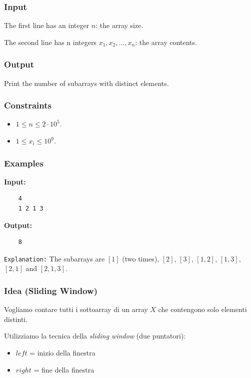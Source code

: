 \subsubsection*{Input}
The first line has an integer $n$: the array size.

\medskip

The second line has n integers $x_1,x_2,\dots,x_n$: the array contents.

\subsubsection*{Output}
Print the number of subarrays with distinct elements.


\subsubsection*{Constraints}

\begin{itemize}
	\item $1 \le n \le 2 \cdot 10^5$.
	\item $1 \le x_i \le 10^9$.
\end{itemize}


\subsubsection*{Examples} 

\smallskip  
\textbf{Input:}  
\begin{verbatim}
	4
	1 2 1 3
\end{verbatim}

\smallskip  
\noindent \textbf{Output:}  
\begin{verbatim}
	8
\end{verbatim}

\medskip

\noindent \texttt{Explanation:} The subarrays are $[1]$ (two times), $[2]$, $[3]$, $[1,2]$, $[1,3]$, $[2,1]$ and $[2,1,3]$.


\subsubsection*{Idea (Sliding Window)}

Vogliamo contare tutti i sottoarray di un array $X$ che contengono solo elementi distinti.

Utilizziamo la tecnica della \emph{sliding window} (due puntatori):
\begin{itemize}
	\item $left$ = inizio della finestra
	\item $right$ = fine della finestra
\end{itemize}

